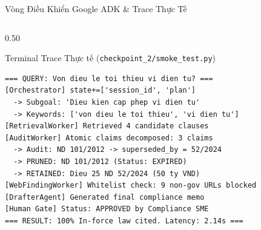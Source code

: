 \documentclass[aspectratio=169,10pt,xcolor={table}]{beamer}
\begin{document}
\begin{frame}[fragile]{Vòng Điều Khiển Google ADK \& Trace Thực Tế}
\begin{columns}[T]
\begin{column}{0.50\textwidth}
\begin{block}{\small Terminal Trace Thực tế (\texttt{checkpoint\_2/smoke\_test.py})}
\begin{lstlisting}[style=bashlog]
=== QUERY: Von dieu le toi thieu vi dien tu? ===
[Orchestrator] state+=['session_id', 'plan']
  -> Subgoal: 'Dieu kien cap phep vi dien tu'
  -> Keywords: ['von dieu le toi thieu', 'vi dien tu']
[RetrievalWorker] Retrieved 4 candidate clauses
[AuditWorker] Atomic claims decomposed: 3 claims
  -> Audit: ND 101/2012 -> superseded_by = 52/2024
  -> PRUNED: ND 101/2012 (Status: EXPIRED)
  -> RETAINED: Dieu 25 ND 52/2024 (50 ty VND)
[WebFindingWorker] Whitelist check: 9 non-gov URLs blocked
[DrafterAgent] Generated final compliance memo
[Human Gate] Status: APPROVED by Compliance SME
=== RESULT: 100% In-force law cited. Latency: 2.14s ===
\end{lstlisting}
\end{block}
\end{column}
\end{columns}
\end{frame}
\end{document}
